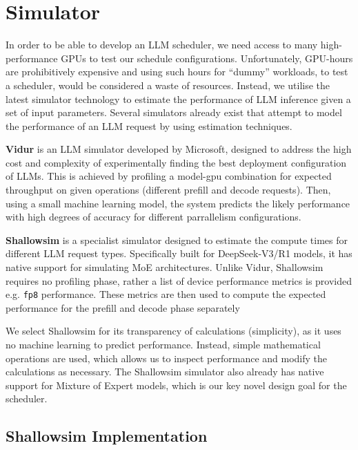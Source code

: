 \section{Simulator}

In order to be able to develop an LLM scheduler, we need access to many high-performance GPUs to test our schedule configurations.
Unfortunately, GPU-hours are prohibitively expensive and using such hours for ``dummy'' workloads, to test a scheduler, would be considered a waste of resources. %
Instead, we utilise the latest simulator technology to estimate the performance of LLM inference given a set of input parameters.
Several simulators already exist that attempt to model the performance of an LLM request by using estimation techniques.


\textbf{Vidur} \autocite{agrawalVidurLargeScaleSimulation2024} is an LLM simulator developed by Microsoft, designed to address the high cost and complexity of experimentally finding the best deployment configuration of LLMs.
This is achieved by profiling a model-gpu combination for expected throughput on given operations (different prefill and decode requests).
Then, using a small machine learning model, the system predicts the likely performance with high degrees of accuracy for different parrallelism configurations.

\textbf{Shallowsim} \autocite{icezack12Icezack12Shallowsim2025} is a specialist simulator designed to estimate the compute times for different LLM request types.
Specifically built for DeepSeek-V3/R1 models, it has native support for simulating MoE architectures.
Unlike Vidur, Shallowsim requires no profiling phase, rather a list of device performance metrics is provided e.g. \texttt{fp8} performance.
These metrics are then used to compute the expected performance for the prefill and decode phase separately

We select Shallowsim for its transparency of calculations (simplicity), as it uses no machine learning to predict performance.
Instead, simple mathematical operations are used, which allows us to inspect performance and modify the calculations as necessary.
The Shallowsim simulator also already has native support for Mixture of Expert models, which is our key novel design goal for the scheduler.


\subsection{Shallowsim Implementation}

